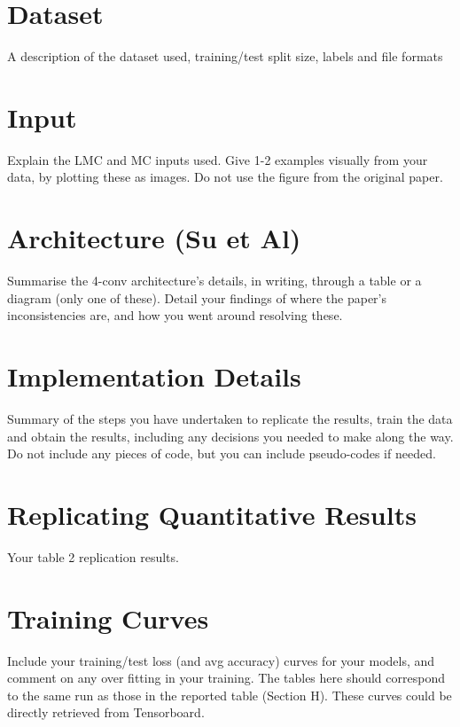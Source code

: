 \documentclass[conference]{IEEEtran}
\begin{document}
\section{Dataset}
A description of the dataset used, training/test split size, labels and file formats

\section{Input}
Explain the LMC and MC inputs used. Give 1-2 examples visually from your data, by plotting these as images. Do not use the figure from the original paper. 

\section{Architecture (Su et Al)}
Summarise the 4-conv architecture’s details, in writing, through a table or a diagram (only one of these). Detail your findings of where the paper’s inconsistencies are, and how you went around resolving these. 

\section{Implementation Details}
Summary of the steps you have undertaken to replicate the results, train the data and obtain the results, including any decisions you needed to make along the way. Do not include any pieces of code, but you can include pseudo-codes if needed. 

\section{Replicating Quantitative Results}
Your table 2 replication results. 

\section{Training Curves}
Include your training/test loss (and avg accuracy) curves for your models, and comment on any over fitting in your training. The tables here should correspond to the same run as those in the reported table (Section H). These curves could be directly retrieved from Tensorboard. 
\end{document}
